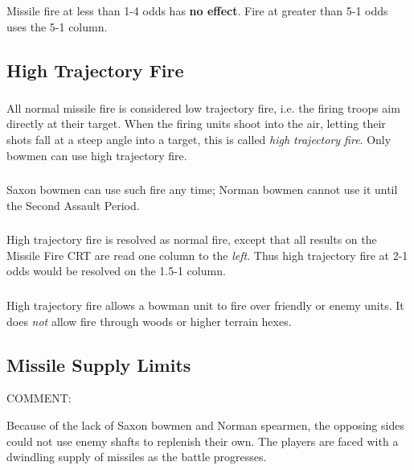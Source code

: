 \subsubsection[Low Odds]{} Missile fire at less than 1-4 odds has \textbf{no effect}. Fire at greater than 5-1 odds uses the 5-1 column.

\subsection{High Trajectory Fire}

\subsubsection[Low Trajectory Fire]{} All normal missile fire is considered low trajectory fire, i.e. the firing troops aim directly at their target. When the firing units shoot into the air, letting their shots fall at a steep angle into a target, this is called \textit{high trajectory fire}. Only bowmen can use high trajectory fire.

\subsubsection[Saxon Bowmen]{} Saxon bowmen can use such fire any time; Norman bowmen cannot use it until the Second Assault Period.

\subsubsection[Resolution]{} High trajectory fire is resolved as normal fire, except that all results on the Missile Fire CRT are read one column to the \textit{left}. Thus high trajectory fire at 2-1 odds would be resolved on the 1.5-1 column.

\subsubsection[Terrain]{} High trajectory fire allows a bowman unit to fire over friendly or enemy units. It does \textit{not} allow fire through woods or higher terrain hexes.

\subsection{Missile Supply Limits}

COMMENT:

Because of the lack of Saxon bowmen and Norman spearmen, the opposing sides could not use enemy shafts to replenish their own. The players are faced with a dwindling supply of missiles as the battle progresses.

